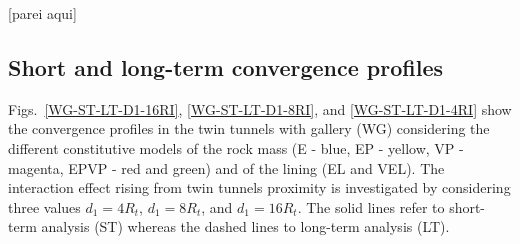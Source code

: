 \documentclass[a4paper,fleqn]{cas-sc}
\begin{document}
[parei aqui]


\subsection{Short and long-term convergence profiles}\label{sec72}

Figs.~\ref{WG-ST-LT-D1-16RI}, \ref{WG-ST-LT-D1-8RI}, and \ref{WG-ST-LT-D1-4RI} show the convergence profiles in the twin tunnels with gallery (WG) considering the different constitutive models of the rock mass (E - blue, EP - yellow, VP - magenta, EPVP - red and green) and of the lining (EL and VEL). The interaction effect rising from twin tunnels proximity is investigated by considering three values $d_1=4R_t$, $d_1=8R_t$, and $d_1=16R_t$.  The solid lines refer to short-term analysis (ST) whereas the dashed lines to long-term analysis (LT).
\end{document}
